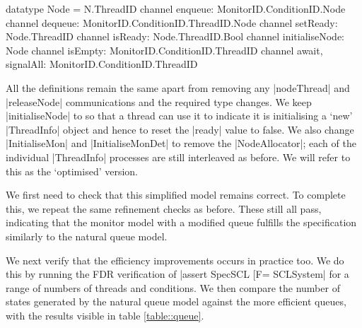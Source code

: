 \begin{cspm}
  datatype Node = N.ThreadID
  channel enqueue: MonitorID.ConditionID.Node 
  channel dequeue: MonitorID.ConditionID.ThreadID.Node
  channel setReady: Node.ThreadID
  channel isReady: Node.ThreadID.Bool
  channel initialiseNode: Node
  channel isEmpty: MonitorID.ConditionID.ThreadID
  channel await, signalAll: MonitorID.ConditionID.ThreadID
\end{cspm}

All the definitions remain the same apart from removing any |nodeThread| and |releaseNode| communications and the required type changes. We keep |initialiseNode| to so that a thread can use it to indicate it is initialising a `new' |ThreadInfo| object and hence to reset the |ready| value to false. We also change |InitialiseMon| and |InitialiseMonDet| to remove the |NodeAllocator|; each of the individual |ThreadInfo| processes are still interleaved as before. We will refer to this as the `optimised' version.

We first need to check that this simplified model remains correct. To complete this, we repeat the same refinement checks as before. These still all pass, indicating that the monitor model with a modified queue fulfills the specification similarly to the natural queue model.

We next verify that the efficiency improvements occurs in practice too. We do this by running the FDR verification of |assert SpecSCL [F= SCLSystem| for a range of numbers of threads and conditions. We then compare the number of states generated by the natural queue model against the more efficient queues, with the results visible in table \ref{table::queue}.

\def\thickhline{\noalign{\hrule height 1.5pt}}

